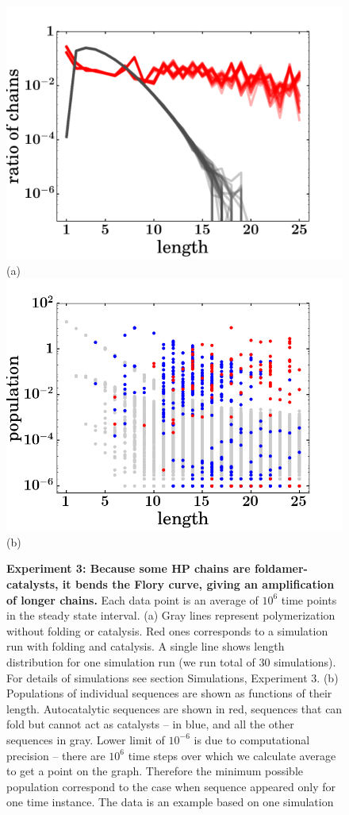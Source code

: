 \documentclass[journal=jacsat,manuscript=article,layout=twocolumn]{achemso}
\begin{document}
\begin{figure}[htb!]
  \centering
  \includegraphics[width=0.9\columnwidth]{pictures/distrHP-plain-many.pdf}(a) 
  \includegraphics[width=0.9\columnwidth]{pictures/scatter1837.png}(b) 
  \caption{\footnotesize{\textbf{Experiment 3: Because some HP chains are foldamer-catalysts, it 
bends the Flory curve, giving an amplification of longer chains.}  Each data point is an average 
of 
$10^6$ time points in the steady state interval. (a) Gray lines represent polymerization without 
folding or catalysis. Red ones corresponds to a simulation run with folding and catalysis. A 
single 
line shows length distribution for one simulation run (we run total of 30 simulations). For 
details 
of simulations see section Simulations, Experiment 3. (b) Populations of individual sequences are 
shown as 
functions of their length. Autocatalytic sequences are shown in red, sequences that can fold but 
cannot act as  catalysts -- in blue, and all the other sequences in gray. Lower limit of $10^{-6}$ 
is due to computational precision -- there are $10^6$ time steps over which we calculate average 
to 
get a point on the graph. Therefore the minimum possible population correspond to the case when 
sequence appeared only for one time instance. The data is an example based on one simulation}}
  \label{fig:stats-scatter-018}
\end{figure}
\end{document}
